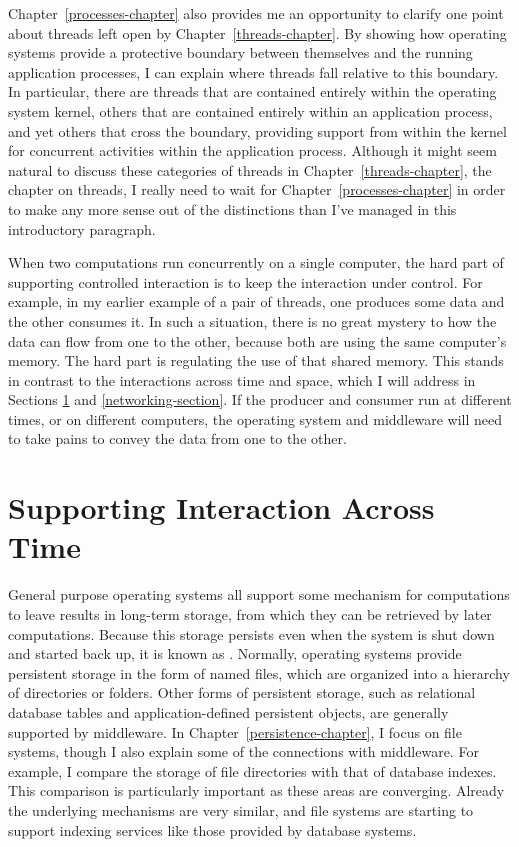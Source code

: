 Chapter~\ref{processes-chapter} also provides me an opportunity to
clarify one point about threads left open by
Chapter~\ref{threads-chapter}.  By showing how operating systems
provide a protective boundary between themselves and the running
application processes, I can explain where threads fall relative to
this boundary.  In particular, there are threads that are contained
entirely within the operating system kernel, others that are contained entirely
within an application process, and yet others that cross the boundary,
providing support from within the kernel for concurrent activities
within the application process.  Although it might seem natural to
discuss these categories of threads in Chapter~\ref{threads-chapter},
the chapter on threads, I really need to wait for
Chapter~\ref{processes-chapter} in order to make any more sense out of
the distinctions than I've managed in this introductory paragraph.

When two computations run concurrently on a single computer, the hard
part of supporting controlled interaction is to keep the interaction
under control.  For example, in my earlier example of a
pair of threads, one produces some data and the other consumes it.
In such a situation, there is no great mystery to how the data can flow from one to the
other, because both are using the same computer's memory.  The hard
part is regulating the use of that shared memory.  This stands in
contrast to the interactions across time and space, which I will address in Sections
\ref{persistence-section} and \ref{networking-section}.  If the producer and consumer run
at different times, or on different computers, the operating system
and middleware will need to take pains to convey the data from one to
the other.

\section{Supporting Interaction Across Time}\label{persistence-section}

General purpose operating systems all support some mechanism for
computations to leave results in long-term storage, from which they can be
retrieved by later computations.  Because this storage persists even
when the system is shut down and started back up, it is known as
.  Normally, operating systems provide
persistent storage in the form of named files, which are organized into a
hierarchy of directories or folders.  Other forms of persistent
storage, such as relational database tables and application-defined
persistent objects, are generally supported by middleware.  In
Chapter~\ref{persistence-chapter}, I focus on file systems, though I
also explain some of the connections with middleware.  For example, I
compare the storage of file directories with that of database
indexes.  This comparison is particularly important as these areas are
converging.  Already the underlying mechanisms are very similar, and
file systems are starting to support indexing services like
those provided by database systems.

